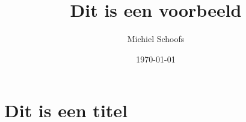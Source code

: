 \documentclass[12pt,twoside,a4paper]{article}
\author{Michiel Schoofs}
\title{Dit is een voorbeeld}
\date{\today}
\begin{document}
\maketitle
\section{Dit is een titel}
\end{document}
